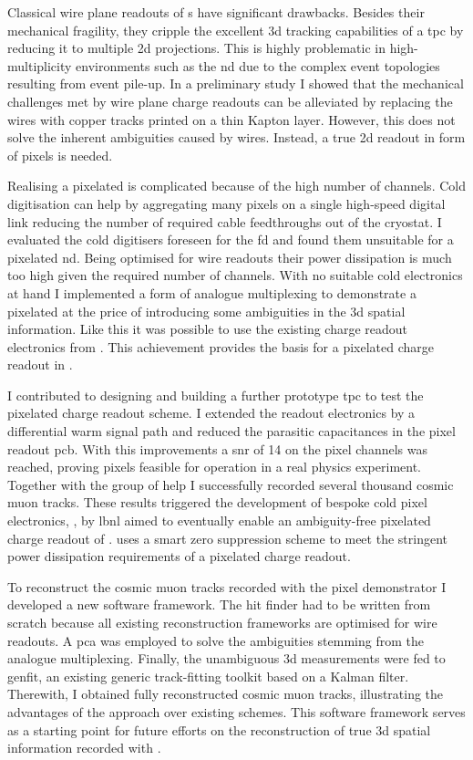 Classical wire plane readouts of \lartpc{}s have significant drawbacks.
Besides their mechanical fragility, they cripple the excellent \gls{3d} tracking capabilities of a \gls{tpc} by reducing it to multiple \gls{2d} projections.
This is highly problematic in high-multiplicity environments such as the \dune{} \gls{nd} due to the complex event topologies resulting from event pile-up.
In a preliminary study I showed that the mechanical challenges met by wire plane charge readouts can be alleviated by replacing the wires with copper tracks printed on a thin Kapton layer.
However, this does not solve the inherent ambiguities caused by wires.
Instead, a true \gls{2d} readout in form of pixels is needed.

Realising a pixelated \lartpc{} is complicated because of the high number of channels.
Cold digitisation can help by aggregating many pixels on a single high-speed digital link reducing the number of required cable feedthroughs out of the cryostat.
I evaluated the cold digitisers foreseen for the \dune{} \gls{fd} and found them unsuitable for a pixelated \gls{nd}.
Being optimised for wire readouts their power dissipation is much too high given the required number of channels.
With no suitable cold electronics at hand I implemented a form of analogue multiplexing to demonstrate a pixelated \lartpc{} at the price of introducing some ambiguities in the \gls{3d} spatial information.
Like this it was possible to use the existing charge readout electronics from \AT{}.
This achievement provides the basis for a pixelated charge readout in \AC{}.

I contributed to designing and building a further prototype \gls{tpc} to test the pixelated charge readout scheme.
I extended the \AT{} readout electronics by a differential warm signal path and reduced the parasitic capacitances in the pixel readout \gls{pcb}.
With this improvements a \gls{snr} of \num{14} on the pixel channels was reached, proving pixels feasible for operation in a real physics experiment.
Together with the \lar{} group of \gls{help} I successfully recorded several thousand cosmic muon tracks.
These results triggered the development of bespoke cold pixel electronics, \larpix{}, by \gls{lbnl} aimed to eventually enable an ambiguity-free pixelated charge readout of \AC{}.
\larpix{} uses a smart zero suppression scheme to meet the stringent power dissipation requirements of a pixelated charge readout.

To reconstruct the cosmic muon tracks recorded with the pixel demonstrator I developed a new software framework.
The hit finder had to be written from scratch because all existing \lartpc{} reconstruction frameworks are optimised for wire readouts.
A \gls{pca} was employed to solve the ambiguities stemming from the analogue multiplexing.
Finally, the unambiguous \gls{3d} measurements were fed to \gls{genfit}, an existing generic track-fitting toolkit based on a Kalman filter.
Therewith, I obtained fully reconstructed cosmic muon tracks, illustrating the advantages of the \AC{} approach over existing schemes.
This software framework serves as a starting point for future efforts on the reconstruction of true \gls{3d} spatial information recorded with \AC{}.

